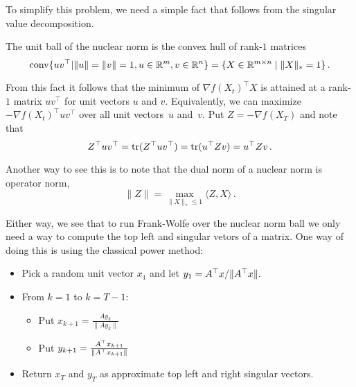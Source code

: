 To simplify this problem, we need a simple fact that follows from the singular
value decomposition.
%
\begin{fact}
The unit ball of the nuclear norm is the convex hull of rank-$1$ matrices
\[
\mathrm{conv}\{uv^\top|\|u\|=\|v\|=1, u\in\mathbb{R}^m, v\in\mathbb{R}^n\}
=\{X\in\mathbb{R}^{m\times n}\mid \|X\|_*=1\}\,.
\]
\end{fact}

From this fact it follows that the minimum of $\nabla f(X_t)^\top X$ is attained
at a rank-$1$ matrix $uv^\top$ for unit vectors $u$ and $v$. 
Equivalently, we can maximize $-\nabla f(X_t)^\top uv^\top$ 
over all unit vectors~$u$ and~$v.$ Put
$Z = -\nabla f(X_T)$ and note that
\[
Z^\top uv^\top = \mathrm{tr}(Z^\top uv^\top) = \mathrm{tr}(u^\top Z v) = u^\top Z v\,.
\]

Another way to see this is to note that 
the dual norm of a nuclear norm is operator norm,
\[
\|Z\| = \max_{\|X\|_*\leq 1}\langle Z, X\rangle\,.
\]

Either way, we see that to run Frank-Wolfe over the nuclear norm ball we only
need a way to compute the top left and singular vetors of a matrix. One way of
doing this is using the classical power method:

\begin{itemize}
\item Pick a random unit vector $x_1$ and let $y_1 = A^\top x/\|A^\top x\|.$
\item From $k=1$ to $k=T-1:$
\begin{itemize}
\item Put $x_{k+1}=\frac{Ay_k}{\|Ay_k\|}$
\item Put $y_{k+1}=\frac{A^\top x_{k+1}}{\|A^\top x_{k+1}\|}$
\end{itemize}
\item Return $x_T$ and $y_T$ 
as approximate top left and right singular vectors.
\end{itemize}
